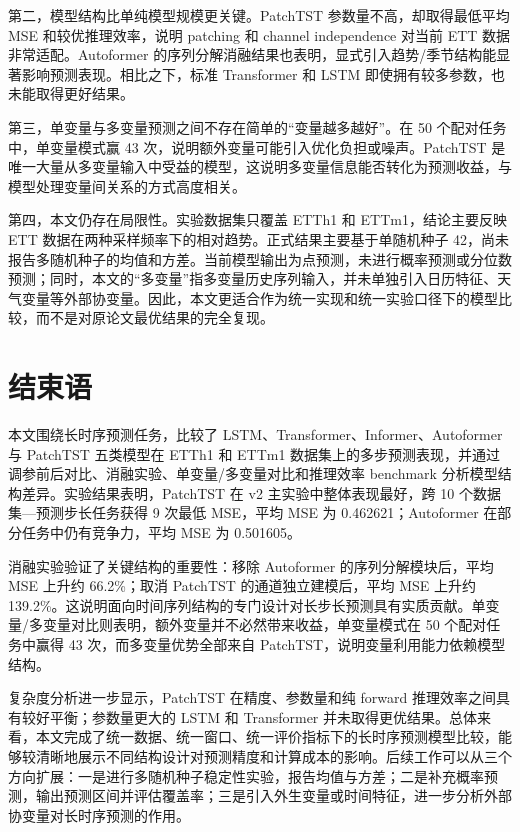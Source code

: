 第二，模型结构比单纯模型规模更关键。PatchTST 参数量不高，却取得最低平均 MSE 和较优推理效率，说明 patching 和 channel independence 对当前 ETT 数据非常适配。Autoformer 的序列分解消融结果也表明，显式引入趋势/季节结构能显著影响预测表现。相比之下，标准 Transformer 和 LSTM 即使拥有较多参数，也未能取得更好结果。

第三，单变量与多变量预测之间不存在简单的``变量越多越好''。在 50 个配对任务中，单变量模式赢 43 次，说明额外变量可能引入优化负担或噪声。PatchTST 是唯一大量从多变量输入中受益的模型，这说明多变量信息能否转化为预测收益，与模型处理变量间关系的方式高度相关。

第四，本文仍存在局限性。实验数据集只覆盖 ETTh1 和 ETTm1，结论主要反映 ETT 数据在两种采样频率下的相对趋势。正式结果主要基于单随机种子 42，尚未报告多随机种子的均值和方差。当前模型输出为点预测，未进行概率预测或分位数预测；同时，本文的``多变量''指多变量历史序列输入，并未单独引入日历特征、天气变量等外部协变量。因此，本文更适合作为统一实现和统一实验口径下的模型比较，而不是对原论文最优结果的完全复现。

\section{结束语}\label{ux7ed3ux8bed}

本文围绕长时序预测任务，比较了 LSTM、Transformer、Informer、Autoformer 与 PatchTST 五类模型在 ETTh1 和 ETTm1 数据集上的多步预测表现，并通过调参前后对比、消融实验、单变量/多变量对比和推理效率 benchmark 分析模型结构差异。实验结果表明，PatchTST 在 v2 主实验中整体表现最好，跨 10 个数据集---预测步长任务获得 9 次最低 MSE，平均 MSE 为 0.462621；Autoformer 在部分任务中仍有竞争力，平均 MSE 为 0.501605。

消融实验验证了关键结构的重要性：移除 Autoformer 的序列分解模块后，平均 MSE 上升约 66.2\%；取消 PatchTST 的通道独立建模后，平均 MSE 上升约 139.2\%。这说明面向时间序列结构的专门设计对长步长预测具有实质贡献。单变量/多变量对比则表明，额外变量并不必然带来收益，单变量模式在 50 个配对任务中赢得 43 次，而多变量优势全部来自 PatchTST，说明变量利用能力依赖模型结构。

复杂度分析进一步显示，PatchTST 在精度、参数量和纯 forward 推理效率之间具有较好平衡；参数量更大的 LSTM 和 Transformer 并未取得更优结果。总体来看，本文完成了统一数据、统一窗口、统一评价指标下的长时序预测模型比较，能够较清晰地展示不同结构设计对预测精度和计算成本的影响。后续工作可以从三个方向扩展：一是进行多随机种子稳定性实验，报告均值与方差；二是补充概率预测，输出预测区间并评估覆盖率；三是引入外生变量或时间特征，进一步分析外部协变量对长时序预测的作用。

